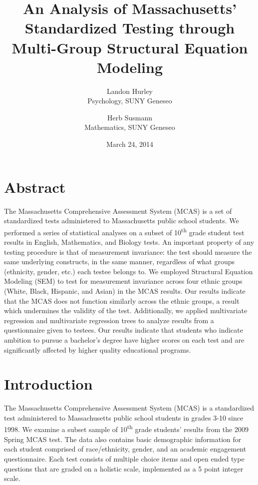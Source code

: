 \documentclass{article}\usepackage[]{graphicx}\usepackage[]{color}
\begin{document}
\title{An Analysis of Massachusetts' Standardized Testing through Multi-Group Structural Equation Modeling}
\date{March 24, 2014}
\author{Landon Hurley\\ Psychology, SUNY Geneseo \and Herb Susmann\\ Mathematics, SUNY Geneseo}

\maketitle

\section{Abstract}

The Massachusetts Comprehensive Assessment System (MCAS) is a set of standardized tests administered to Massachusetts public school students. We performed a series of statistical analyses on a subset of 10\textsuperscript{th} grade student test results in English, Mathematics, and Biology tests. An important property of any testing procedure is that of measurement invariance: the test should measure the same underlying constructs, in the same manner, regardless of what groups (ethnicity, gender, etc.) each testee belongs to. We employed Structural Equation Modeling (SEM) to test for measurement invariance across four ethnic groups (White, Black, Hispanic, and Asian) in the MCAS results. Our results indicate that the MCAS does not function similarly across the ethnic groups, a result which undermines the validity of the test. Additionally, we applied multivariate regression and multivariate regression trees to analyze results from a questionnaire given to testees. Our results indicate that students who indicate ambition to pursue a bachelor's degree have higher scores on each test and are significantly affected by higher quality educational programs.

\section{Introduction}

The Massachusetts Comprehensive Assessment System (MCAS) is a standardized test administered to Massachusetts public school students in grades 3-10 since 1998. We examine a subset sample of 10\textsuperscript{th} grade students' results from the 2009 Spring MCAS test. The data also contains basic demographic information for each student comprised of race/ethnicity, gender, and an academic engagement questionnaire. Each test consists of multiple choice items and open ended type questions that are graded on a holistic scale, implemented as a 5 point integer scale. 
\end{document}
